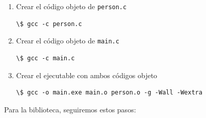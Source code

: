 \documentclass[a4paper]{article}
\begin{document}
\noindent
\begin{minipage}[H]{\linewidth}
\begin{enumerate}
\item Crear el código objeto de \verb!person.c!

\noindent
\begin{minipage}[H]{\linewidth}
\mbox{}
\begin{lstlisting}[style=terminalStyle]
\$ gcc -c person.c
\end{lstlisting}
\end{minipage}
\item Crear el código objeto de \verb!main.c!

\noindent
\begin{minipage}[H]{\linewidth}
\mbox{}
\begin{lstlisting}[style=terminalStyle]
\$ gcc -c main.c
\end{lstlisting}
\end{minipage}
\item Crear el ejecutable con ambos códigos objeto

\noindent
\begin{minipage}[H]{\linewidth}
\mbox{}
\begin{lstlisting}[style=terminalStyle]
\$ gcc -o main.exe main.o person.o -g -Wall -Wextra
\end{lstlisting}
\end{minipage}
\end{enumerate}
\end{minipage}

Para la biblioteca, seguiremos estos pasos:
\end{document}
